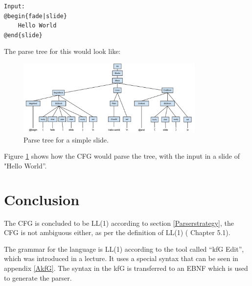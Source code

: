\begin{lstlisting}[frame=single]
Input:
@begin{fade|slide}
    Hello World
@end{slide}
\end{lstlisting}

The parse tree for this would look like: 

\begin{figure}[! h]
\centering
	 \includegraphics[width=350px]{images/ebnfexample.png}
		 \caption{Parse tree for a simple slide.}	
	\label{fig:Parsetree}
\end{figure}
Figure \ref{fig:Parsetree} shows how the CFG would parse the tree, with the input in a slide of "Hello World''. 

\section{Conclusion}
The CFG is concluded to be LL(1) according to section \ref{Parserstrategy}, the CFG is not ambiguous either, as per the definition of LL(1) (\cite{CaC} Chapter 5.1).

The grammar for the language is LL(1) according to the tool called ``kfG Edit'', which was introduced in a lecture. It uses a special syntax that can be seen in appendix \ref{AkfG}. The syntax in the kfG is transferred to an EBNF which is used to generate the parser.